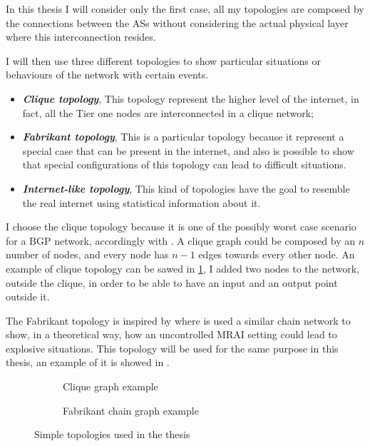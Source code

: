 
In this thesis I will consider only the first case, all my topologies are composed by
the connections between the \acp{AS} without considering the actual physical layer
where this interconnection resides.

I will then use three different topologies to show particular situations or 
behaviours of the network with certain events.
\begin{itemize}
	\item \textbf{\textit{Clique topology}}, This topology represent the higher
		level of the internet, in fact, all the Tier one nodes are interconnected
		in a clique network;
	\item \textbf{\textit{Fabrikant topology}}, This is a particular topology
		because it represent a special case that can be present in the internet,
		and also is possible to show that special configurations of this topology
		can lead to difficult situations.
	\item \textbf{\textit{Internet-like topology}}, This kind of topologies
		have the goal to resemble the real internet using statistical information
		about it.
\end{itemize}

I choose the clique topology because it is one of the possibly worst
case scenario for a \ac{BGP} network, accordingly with \cite{labovitz2000delayed}.
A clique graph could be composed by an $n$ number of nodes, and every node has
$n-1$ edges towards every other node.
An example of clique topology can be sawed in \cref{fig:clique_topology}, I added
two nodes to the network, outside the clique, in order to be able to have an
input and an output point outside it.

The Fabrikant topology is inspired by \cite{fabrikant2011there} where is used
a similar chain network to show, in a theoretical way, how an uncontrolled
\ac{MRAI} setting could lead to explosive situations.
This topology will be used for the same purpose in this thesis, an example
of it is showed in .

\begin{figure}[ht]
     \centering
     \begin{subfigure}[b]{0.45\textwidth}
         \centering
		 
		 \caption{Clique graph example}
    	 \label{fig:clique_topology}
     \end{subfigure}
     \hfill
     \begin{subfigure}[b]{0.45\textwidth}
         \centering
         
		 \caption{Fabrikant chain graph example}
		 \label{fig:fabrikant_topology}
     \end{subfigure}
		\caption{Simple topologies used in the thesis}
        \label{fig:clique_and_fabrikant}
\end{figure}


